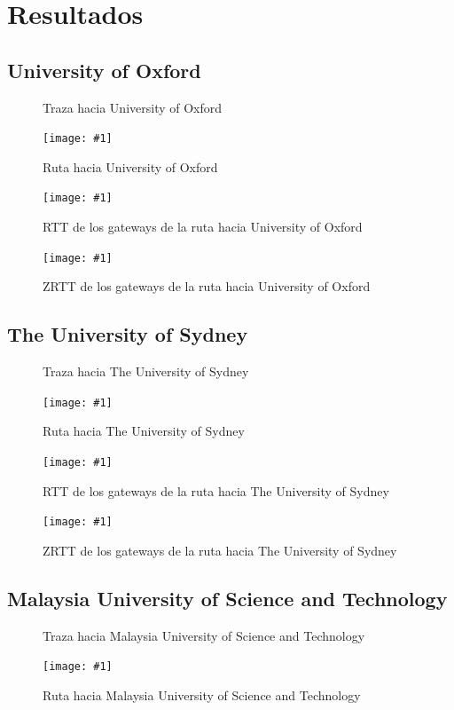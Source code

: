 \documentclass[a4paper, 10pt, twoside]{article}
\newcommand{\estadisticas}[3]{
  \begin{figure}[H]
    \small
    
    \normalsize
    \caption{#2}
    \label{#3}
  \end{figure}
}
\newcommand{\grafico}[3]{
  \begin{figure}[H]
    \texttt{[image: \#1]}
    \caption{#2}
    \label{#3}
  \end{figure}
}
\newcommand{\oxford}{University of Oxford}
\newcommand{\sydney}{The University of Sydney}
\newcommand{\must}{Malaysia University of Science and Technology}
\begin{document}


\section{Resultados}


\subsection{\oxford}

\estadisticas{statistics-www.ox.ac.uk.txt}
             {Traza hacia \oxford}
             {fig:trace-oxford}

\grafico{map-www.ox.ac.uk}
        {Ruta hacia \oxford}
        {fig:map-oxford}

\grafico{rtt-www.ox.ac.uk}
        {RTT de los gateways de la ruta hacia \oxford}
        {fig:rtt-oxford}

\grafico{zrtt-www.ox.ac.uk}
        {ZRTT de los gateways de la ruta hacia \oxford}
        {fig:zrtt-oxford}


\subsection{\sydney}

\estadisticas{statistics-www.sydney.edu.au.txt}
             {Traza hacia \sydney}
             {fig:trace-sydney}

\grafico{map-www.sydney.edu.au}
        {Ruta hacia \sydney}
        {fig:map-sydney}

\grafico{rtt-www.sydney.edu.au}
        {RTT de los gateways de la ruta hacia \sydney}
        {fig:rtt-sydney}

\grafico{zrtt-www.sydney.edu.au}
        {ZRTT de los gateways de la ruta hacia \sydney}
        {fig:zrtt-sydney}


\subsection{\must}

\estadisticas{statistics-www.must.edu.my.txt}
             {Traza hacia \must}
             {fig:trace-must}

\grafico{map-www.must.edu.my}
        {Ruta hacia \must}
        {fig:map-must}
\end{document}
